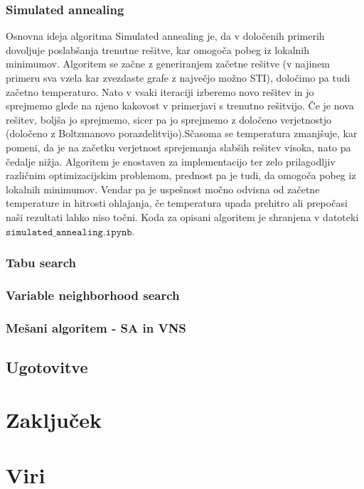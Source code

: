 \documentclass[a4paper,12pt]{article}
\begin{document}
\subsubsection{Simulated annealing}
Osnovna ideja algoritma Simulated annealing je, da v določenih primerih dovoljuje poslabšanja trenutne rešitve, kar omogoča pobeg
iz lokalnih minimumov. Algoritem se začne z generiranjem začetne rešitve (v najinem primeru sva vzela kar zvezdaste grafe z 
največjo možno STI), določimo pa tudi začetno temperaturo. Nato v vsaki iteraciji izberemo novo rešitev in jo sprejmemo glede na 
njeno kakovost v primerjavi s trenutno rešitvijo. Če je nova rešitev, boljša jo sprejmemo, sicer pa jo sprejmemo z določeno 
verjetnostjo (določeno z Boltzmanovo porazdelitvijo).Sčasoma se temperatura zmanjšuje, kar pomeni, da je na začetku verjetnost 
sprejemanja slabših rešitev visoka, nato pa čedalje nižja. Algoritem je enostaven za implementacijo ter zelo prilagodljiv različnim 
optimizacijskim problemom, prednost pa je tudi, da omogoča pobeg iz lokalnih minimumov. Vendar pa je uspešnost močno odvisna od 
začetne temperature in hitrosti ohlajanja, če temperatura upada prehitro ali prepočasi naši rezultati lahko niso točni.
Koda za opisani algoritem je shranjena v datoteki $\texttt{simulated\_annealing.ipynb}$.

\subsubsection{Tabu search}



\subsubsection{Variable neighborhood search}
\subsubsection{Mešani algoritem - SA in VNS}
\subsection{Ugotovitve}

\section{Zaključek}

\section{Viri}
\end{document}
